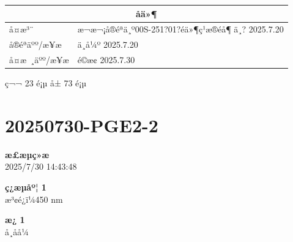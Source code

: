 \documentclass[UTF8,10pt,a4paper,fontset=fandol]{ctexart}
\newcommand{\fieldvalue}[1]{#1}
\newcommand{\handwritten}[1]{#1}
\begin{document}
\begin{center}
\begin{center}
\begin{center}
\setlength{\arrayrulewidth}{0.5pt}
\begin{tabularx}{0.86\textwidth}{|p{}|X|}
\hline
\multicolumn{2}{|c|}{åä»¶} \\
\hline
å¤æ³¨ &
\fieldvalue{\handwritten{æ¬æ¬¡å®éªä¸º00S-251?01?éä»¶ç¹æ®éå¶}} \quad
\fieldvalue{\handwritten{ä¸? 2025.7.20}} \\
\hline
å®éªäºº/æ¥æ &
\fieldvalue{\handwritten{ä¸å¼º 2025.7.20}} \\
\hline
å¤æ ¸äºº/æ¥æ &
\fieldvalue{\handwritten{é©æ¢ 2025.7.30}} \\
\hline
\end{tabularx}
\end{center}

\vfill

\begin{center}
ç¬¬ 23 é¡µ å± 73 é¡µ
\end{center}

\newpage

\section*{20250730-PGE2-2}

\textbf{æ£æµç»æ}\\
2025/7/30 14:43:48

\textbf{ç¿æµåº¦ 1}\\
æ³¢é¿ï¼450 nm

\textbf{æ¿ 1}\\
å¸åå¼


\end{center}
\end{center}
\end{document}
